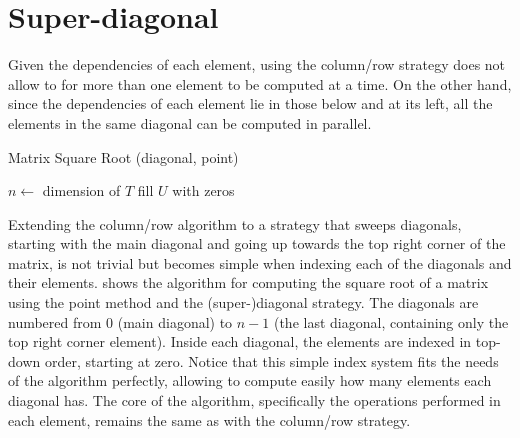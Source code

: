 \documentclass[../thesis]{subfiles}
\begin{document}
		\section{Super-diagonal}		

		Given the dependencies of each element, using the column/row strategy does not allow to for more than one element to be computed at a time. On the other hand, since the dependencies of each element lie in those below and at its left, all the elements in the same diagonal can be computed in parallel.

		\begin{algorithm}[htp]
			\caption{Matrix Square Root (diagonal, point)}
			\label{alg:multicore:diagonal:point}
			\DontPrintSemicolon


			$n \leftarrow$ dimension of $T$\;
			fill $U$ with zeros\;

		\end{algorithm}

		Extending the column/row algorithm to a strategy that sweeps diagonals, starting with the main diagonal and going up towards the top right corner of the matrix, is not trivial but becomes simple when indexing each of the diagonals and their elements.  shows the algorithm for computing the square root of a matrix using the point method and the (super-)diagonal strategy. The diagonals are numbered from $0$ (main diagonal) to $n-1$ (the last diagonal, containing only the top right corner element). Inside each diagonal, the elements are indexed in top-down order, starting at zero. Notice that this simple index system fits the needs of the algorithm perfectly, allowing to compute easily how many elements each diagonal has. The core of the algorithm, specifically the operations performed in each element, remains the same as with the column/row strategy.
\end{document}
